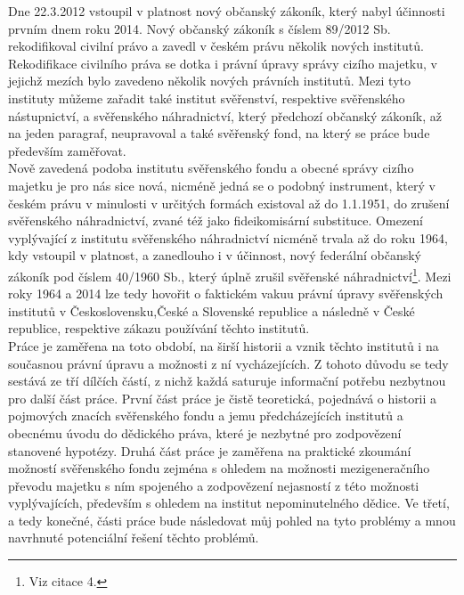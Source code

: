 \documentclass{article}
\begin{document}
\indent Dne 22.3.2012 vstoupil v platnost nový občanský zákoník, který nabyl účinnosti prvním dnem roku 2014. Nový občanský zákoník s číslem 89/2012 Sb. rekodifikoval civilní právo a zavedl v českém právu několik nových institutů. Rekodifikace civilního práva se dotka i právní úpravy správy cizího majetku, v jejichž mezích bylo zavedeno několik nových právních institutů. Mezi tyto instituty můžeme zařadit také institut svěřenství, respektive svěřenského nástupnictví, a svěřenského náhradnictví, který předchozí občanský zákoník, až na jeden paragraf, neupravoval a také svěřenský fond, na který se práce bude především zaměřovat. \\

\indent Nově zavedená podoba institutu svěřenského fondu a obecné správy cizího majetku je pro nás sice nová, nicméně jedná se o podobný instrument, který v českém právu v minulosti v určitých formách existoval až do 1.1.1951, do zrušení svěřens\-kého náhradnictví, zvané též jako fideikomisární substituce. Omezení vyplývající z institutu svěřenského náhradnictví nicméně trvala až do roku 1964, kdy vstoupil v platnost, a zanedlouho i v účinnost, nový federální občanský zákoník pod číslem 40/1960 Sb., který úplně zrušil svěřenské náhradnictví\footnote{Viz citace 4.}. Mezi roky 1964 a 2014 lze tedy hovořit o faktickém vakuu právní úpravy svěřen\-ských institutů v Československu,České a Slovenské republice a následně v České republice, respektive zákazu používání těchto institutů.\\

\indent Práce je zaměřena na toto období, na širší historii a vznik těchto institutů i na současnou právní úpravu a možnosti z ní vycházejících. Z tohoto důvodu se tedy sestává ze tří dílčích částí, z nichž každá saturuje informační potřebu nezbytnou pro další část práce. První část práce je čistě teoretická, pojednává o historii a pojmových znacích svěřenského fondu a jemu předcházejících institutů a obecnému úvodu do dědického práva, které je nezbytné pro zodpovězení stanovené hypotézy. Druhá část práce je zaměřena na praktické zkou\-mání možností svěřenského fondu zejména s ohledem na možnosti mezigeneračního převodu majetku s ním spojeného a zodpovězení nejasností z této možnosti vyplývajících, především s ohledem na institut nepominutelného dědice. Ve třetí, a tedy konečné, části práce bude následovat můj pohled na tyto problémy a mnou navrhnuté potenciální řešení těchto problémů. 
\end{document}
